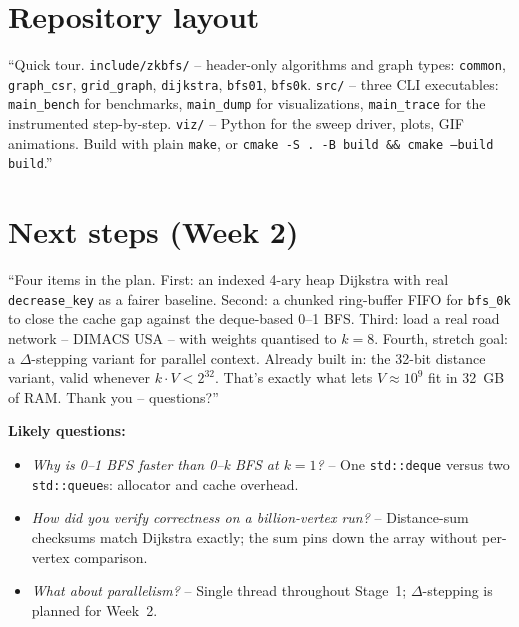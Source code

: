 \documentclass[11pt,a4paper]{article}
\begin{document}
\section{Repository layout}
``Quick tour. \texttt{include/zkbfs/} -- header-only algorithms and
graph types: \texttt{common}, \texttt{graph\_csr}, \texttt{grid\_graph},
\texttt{dijkstra}, \texttt{bfs01}, \texttt{bfs0k}. \texttt{src/} --
three CLI executables: \texttt{main\_bench} for benchmarks,
\texttt{main\_dump} for visualizations, \texttt{main\_trace} for the
instrumented step-by-step. \texttt{viz/} -- Python for the sweep
driver, plots, GIF animations. Build with plain \texttt{make}, or
\texttt{cmake -S . -B build \&\& cmake --build build}.''
\hrulefill

\section{Next steps (Week 2)}
``Four items in the plan. First: an indexed 4-ary heap Dijkstra with
real \texttt{decrease\_key} as a fairer baseline. Second: a chunked
ring-buffer FIFO for \texttt{bfs\_0k} to close the cache gap against
the deque-based 0--1 BFS. Third: load a real road network -- DIMACS
USA -- with weights quantised to $k=8$. Fourth, stretch goal: a
$\Delta$-stepping variant for parallel context. Already built in:
the 32-bit distance variant, valid whenever $k\cdot V < 2^{32}$.
That's exactly what lets $V \approx 10^9$ fit in 32~GB of RAM. Thank
you -- questions?''

\textbf{Likely questions:}
\begin{itemize}
\item \emph{Why is 0--1 BFS faster than 0--k BFS at $k=1$?} -- One
\texttt{std::deque} versus two \texttt{std::queue}s: allocator and
cache overhead.
\item \emph{How did you verify correctness on a billion-vertex run?} --
Distance-sum checksums match Dijkstra exactly; the sum pins down the
array without per-vertex comparison.
\item \emph{What about parallelism?} -- Single thread throughout
Stage~1; $\Delta$-stepping is planned for Week~2.
\end{itemize}
\end{document}
